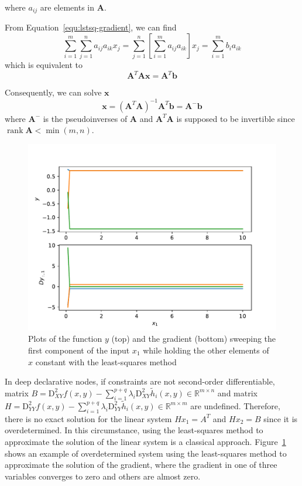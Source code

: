 where $a_{ij}$ are elements in $\mathbf{A}$. 
\par From Equation~\ref{equ:lstsq-gradient}, we can find
\begin{equation}
    \sum_{i=1}^{m} \sum_{j=1}^{n} a_{i j} a_{i k} x_{j}=\sum_{j=1}^{n}\left[\sum_{i=1}^{m} a_{i j} a_{i k}\right] x_{j}=\sum_{i=1}^{m} b_{i} a_{i k}
\end{equation}
which is equivalent to
\begin{equation}
    \mathbf{A}^{T} \mathbf{A} \mathbf{x}=\mathbf{A}^{T} \mathbf{b}
\end{equation}
\par Consequently, we can solve $\mathbf{x}$
\begin{equation}
    \mathbf{x}=\left(\mathbf{A}^{T} \mathbf{A}\right)^{-1} \mathbf{A}^{T} \mathbf{b}=\mathbf{A}^{-} \mathbf{b}
\end{equation}
where $\mathbf{A}^{-}$ is the pseudoinverses of $\mathbf{A}$ and $\mathbf{A}^{T} \mathbf{A}$ is supposed to be invertible since $\operatorname{rank}\mathbf{A} < \operatorname{min}(m, n)$.
\begin{figure}[t]
    \label{fig:least-square}
    \centering
    \includegraphics[page=1, width=.8\textwidth]{figs/least-square.pdf}
    \caption{Plots of the function $y$ (top) and the gradient (bottom) sweeping the first component of the input $x_1$ while holding the other elements of $x$ constant with the least-squares method}
\end{figure}
\par In deep declarative nodes, if constraints are not second-order differentiable, matrix $B=\mathrm{D}_{X Y}^{2} f(x, y)-\sum_{i=1}^{p+q} \lambda_{i} \mathrm{D}_{X Y}^{2} \tilde{h}_{i}(x, y) \in \mathbb{R}^{m \times n}$ and matrix $H=\mathrm{D}_{Y Y}^{2} f(x, y)-\sum_{i=1}^{p+q} \lambda_{i} \mathrm{D}_{Y Y}^{2} \tilde{h}_{i}(x, y) \in \mathbb{R}^{m \times m}$ are undefined. Therefore, there is no exact solution for the linear system $Hx_1 = A^T$ and $Hx_2 = B$ since it is overdetermined. In this circumstance, using the least-squares method to approximate the solution of the linear system is a classical approach. Figure~\ref{fig:least-square} shows an example of overdetermined system using the least-squares method to approximate the solution of the gradient, where the gradient in one of three variables converges to zero and others are almost zero. 
